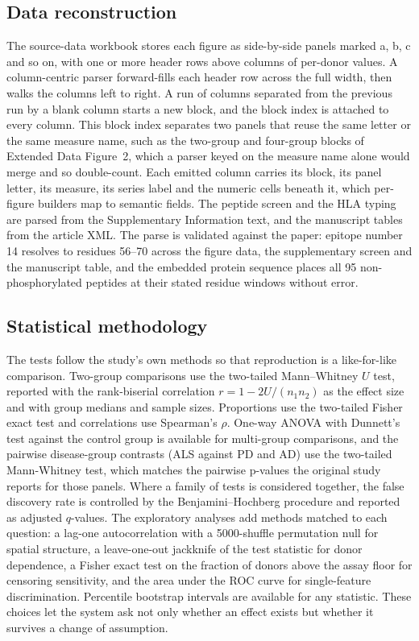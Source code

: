 \documentclass[11pt]{article}
\begin{document}
\subsection{Data reconstruction}
The source-data workbook stores each figure as side-by-side panels marked a, b, c and so on, with one
or more header rows above columns of per-donor values. A column-centric parser forward-fills each
header row across the full width, then walks the columns left to right. A run of columns separated
from the previous run by a blank column starts a new block, and the block index is attached to every
column. This block index separates two panels that reuse the same letter or the same measure name,
such as the two-group and four-group blocks of Extended Data Figure~2, which a parser keyed on the
measure name alone would merge and so double-count. Each emitted column carries its block, its panel
letter, its measure, its series label and the numeric cells beneath it, which per-figure builders map
to semantic fields. The peptide screen and the HLA typing are parsed from the Supplementary
Information text, and the manuscript tables from the article XML. The parse is validated against the
paper: epitope number 14 resolves to residues 56--70 across the figure data, the supplementary screen
and the manuscript table, and the embedded protein sequence places all 95 non-phosphorylated peptides
at their stated residue windows without error.

\subsection{Statistical methodology}
The tests follow the study's own methods so that reproduction is a like-for-like comparison. Two-group
comparisons use the two-tailed Mann--Whitney $U$ test, reported with the rank-biserial correlation
$r = 1 - 2U/(n_1 n_2)$ as the effect size and with group medians and sample sizes. Proportions use
the two-tailed Fisher exact test and correlations use Spearman's $\rho$. One-way ANOVA with Dunnett's
test against the control group is available for multi-group comparisons, and the pairwise disease-group
contrasts (ALS against PD and AD) use the two-tailed Mann-Whitney test, which matches the pairwise
p-values the original study reports for those panels. Where a family of tests is considered
together, the false discovery rate is controlled by the Benjamini--Hochberg procedure and reported as
adjusted $q$-values. The exploratory analyses add methods matched to each question: a lag-one
autocorrelation with a 5000-shuffle permutation null for spatial structure, a leave-one-out jackknife
of the test statistic for donor dependence, a Fisher exact test on the fraction of donors above the
assay floor for censoring sensitivity, and the area under the ROC curve for single-feature
discrimination. Percentile bootstrap intervals are available for any statistic. These choices let the
system ask not only whether an effect exists but whether it survives a change of assumption.
\end{document}

